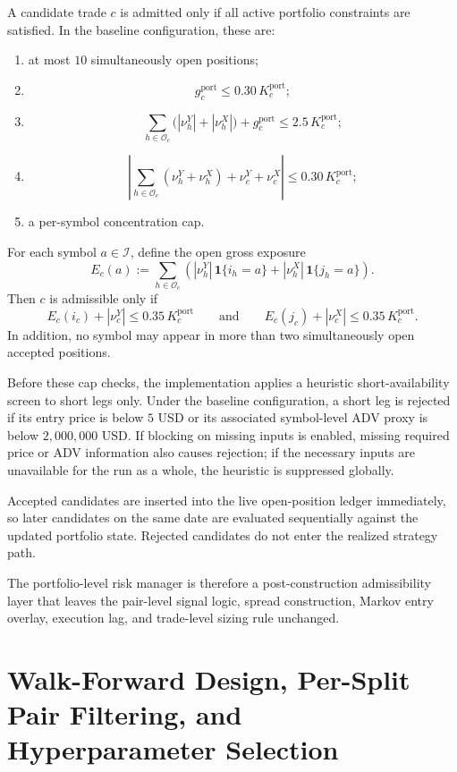 \documentclass[11pt,a4paper]{article}
\begin{document}
A candidate trade \(c\) is admitted only if all active portfolio constraints are
satisfied. In the baseline configuration, these are:
\begin{enumerate}[leftmargin=*, itemsep=2pt, topsep=2pt]
  \item at most \(10\) simultaneously open positions;
  \item
  \[
    g_c^{\mathrm{port}} \le 0.30\,K_c^{\mathrm{port}};
  \]
  \item
  \[
    \sum_{h\in\mathcal O_c}\bigl(|\nu_h^Y|+|\nu_h^X|\bigr)
    + g_c^{\mathrm{port}}
    \le 2.5\,K_c^{\mathrm{port}};
  \]
  \item
  \[
    \left|
      \sum_{h\in\mathcal O_c}(\nu_h^Y+\nu_h^X)
      + \nu_c^Y + \nu_c^X
    \right|
    \le 0.30\,K_c^{\mathrm{port}};
  \]
  \item a per-symbol concentration cap.
\end{enumerate}

For each symbol \(a \in \mathcal I\), define the open gross exposure
\[
  E_c(a)
  :=
  \sum_{h\in\mathcal O_c}
  \left(
    |\nu_h^Y|\,\mathbf 1\{i_h=a\}
    +
    |\nu_h^X|\,\mathbf 1\{j_h=a\}
  \right).
\]
Then \(c\) is admissible only if
\[
  E_c(i_c)+|\nu_c^Y| \le 0.35\,K_c^{\mathrm{port}}
  \qquad\text{and}\qquad
  E_c(j_c)+|\nu_c^X| \le 0.35\,K_c^{\mathrm{port}}.
\]
In addition, no symbol may appear in more than two simultaneously open accepted
positions.

Before these cap checks, the implementation applies a heuristic
short-availability screen to short legs only. Under the baseline configuration,
a short leg is rejected if its entry price is below \(5\) USD or its associated
symbol-level ADV proxy is below \(2{,}000{,}000\) USD. If blocking on missing
inputs is enabled, missing required price or ADV information also causes
rejection; if the necessary inputs are unavailable for the run as a whole, the
heuristic is suppressed globally.

Accepted candidates are inserted into the live open-position ledger
immediately, so later candidates on the same date are evaluated sequentially
against the updated portfolio state. Rejected candidates do not enter the
realized strategy path.

The portfolio-level risk manager is therefore a post-construction admissibility
layer that leaves the pair-level signal logic, spread construction, Markov entry
overlay, execution lag, and trade-level sizing rule unchanged.


\section{Walk-Forward Design, Per-Split Pair Filtering, and Hyperparameter Selection}
\label{sec:per_split_loader}
\end{document}
